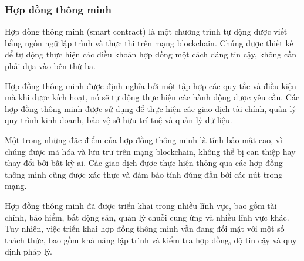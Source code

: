 \subsubsection{Hợp đồng thông minh} 

Hợp đồng thông minh (smart contract) là một chương trình tự động được viết bằng ngôn ngữ lập trình và thực thi trên mạng blockchain. Chúng được thiết kế để tự động thực hiện các điều khoản hợp đồng một cách đáng tin cậy, không cần phải dựa vào bên thứ ba.

Hợp đồng thông minh được định nghĩa bởi một tập hợp các quy tắc và điều kiện mà khi được kích hoạt, nó sẽ tự động thực hiện các hành động được yêu cầu. Các hợp đồng thông minh được sử dụng để thực hiện các giao dịch tài chính, quản lý quy trình kinh doanh, bảo vệ sở hữu trí tuệ và quản lý dữ liệu.

Một trong những đặc điểm của hợp đồng thông minh là tính bảo mật cao, vì chúng được mã hóa và lưu trữ trên mạng blockchain, không thể bị can thiệp hay thay đổi bởi bất kỳ ai. Các giao dịch được thực hiện thông qua các hợp đồng thông minh cũng được xác thực và đảm bảo tính đúng đắn bởi các nút trong mạng.

Hợp đồng thông minh đã được triển khai trong nhiều lĩnh vực, bao gồm tài chính, bảo hiểm, bất động sản, quản lý chuỗi cung ứng và nhiều lĩnh vực khác. Tuy nhiên, việc triển khai hợp đồng thông minh vẫn đang đối mặt với một số thách thức, bao gồm khả năng lập trình và kiểm tra hợp đồng, độ tin cậy và quy định pháp lý.
